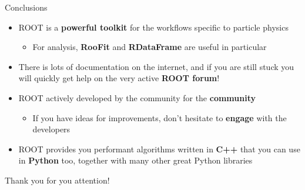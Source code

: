 \documentclass[aspectratio=169]{beamer}
\begin{document}
\begin{frame}{Conclusions}
\begin{itemize}
    \item ROOT is a \textbf{powerful toolkit} for the workflows specific to particle physics
    \begin{itemize}
        \item For analysis, \textbf{RooFit} and \textbf{RDataFrame} are useful in particular
    \end{itemize}
    \item There is lots of documentation on the internet, and if you are still stuck you will quickly get help on the very active \textbf{ROOT forum}!
    \item ROOT actively developed by the community for the \textbf{community}
    \begin{itemize}
        \item If you have ideas for improvements, don't hesitate to \textbf{engage} with the developers
    \end{itemize}
\item ROOT provides you performant algorithms written in \textbf{C++} that you can use in \textbf{Python} too, together with many other great Python libraries
\end{itemize}
    \vspace{5mm}
Thank you for you attention!


\end{frame}

\end{document}
